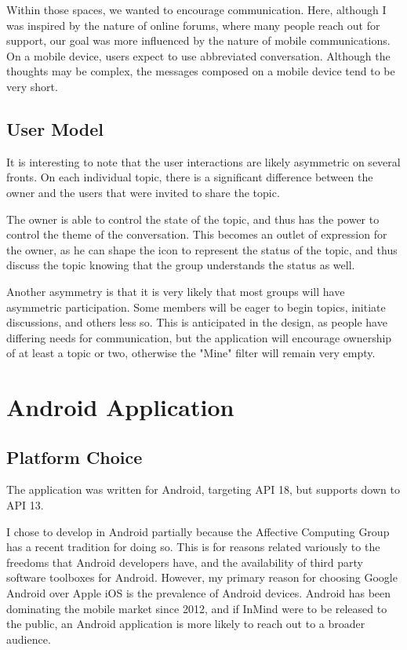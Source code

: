   Within those spaces, we wanted to encourage communication.
  Here, although I was inspired by the nature of online forums,
  where many people reach out for support,
  our goal was more influenced by the nature of mobile communications.
  On a mobile device, users expect to use abbreviated conversation.
  Although the thoughts may be complex, the messages composed on a mobile device
  tend to be very short.

    \subsection{User Model}
      It is interesting to note that the user interactions are likely asymmetric
      on several fronts.
      On each individual topic, there is a significant difference between the owner
      and the users that were invited to share the topic.

      The owner is able to control the state of the topic,
      and thus has the power to control the theme of the conversation.
      This becomes an outlet of expression for the owner,
      as he can shape the icon to represent the status of the topic,
      and thus discuss the topic knowing that the group understands the status as well.

      Another asymmetry is that it is very likely that most groups will
      have asymmetric participation.
      Some members will be eager to begin topics, initiate discussions,
      and others less so.
      This is anticipated in the design,
      as people have differing needs for communication,
      but the application will encourage ownership of at least a topic or two,
      otherwise the "Mine" filter will remain very empty.


  \section{Android Application}

    \subsection{Platform Choice}
    The application was written for Android, targeting API 18,
    but supports down to API 13.

    I chose to develop in Android partially because the Affective Computing Group
    has a recent tradition for doing so.
    This is for reasons related variously to the freedoms that Android developers have,
    and the availability of third party software toolboxes for Android.
    However, my primary reason for choosing Google Android over Apple iOS is
    the prevalence of Android devices.
    Android has been dominating the mobile market since 2012,
    and if InMind were to be released to the public,
    an Android application is more likely to reach out to a broader audience.

